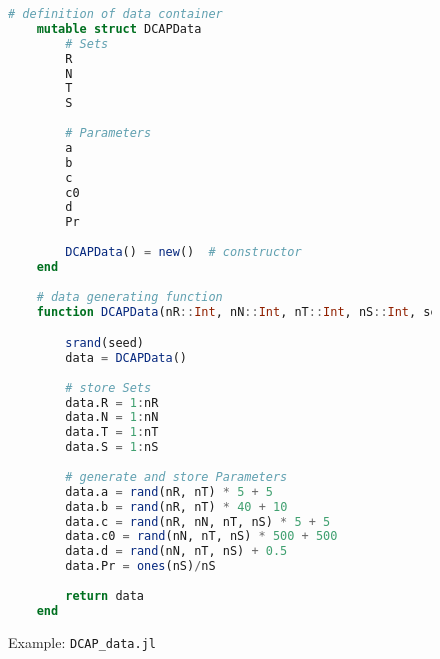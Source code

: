 \begin{figure}[]
	\centering
	\begin{lstlisting}[frame=single,language=julia]
	# definition of data container
	mutable struct DCAPData	
		# Sets
		R   
		N  
		T   
		S  
		
		# Parameters
		a   
		b   
		c  
		c0  
		d   
		Pr  
		
		DCAPData() = new()	# constructor
	end
	
	# data generating function
	function DCAPData(nR::Int, nN::Int, nT::Int, nS::Int, seed::Int)::DCAPData

		srand(seed)
		data = DCAPData()
		
		# store Sets
		data.R = 1:nR	
		data.N = 1:nN	
		data.T = 1:nT	
		data.S = 1:nS	
		
		# generate and store Parameters
		data.a = rand(nR, nT) * 5 + 5
		data.b = rand(nR, nT) * 40 + 10	
		data.c = rand(nR, nN, nT, nS) * 5 + 5	
		data.c0 = rand(nN, nT, nS) * 500 + 500	
		data.d = rand(nN, nT, nS) + 0.5	
		data.Pr = ones(nS)/nS
		
		return data
	end
	\end{lstlisting}
	\caption{Example: \texttt{DCAP\_data.jl}}
	\label{fig:DCAP_data.jl}
\end{figure}
%
%
%
%
%


